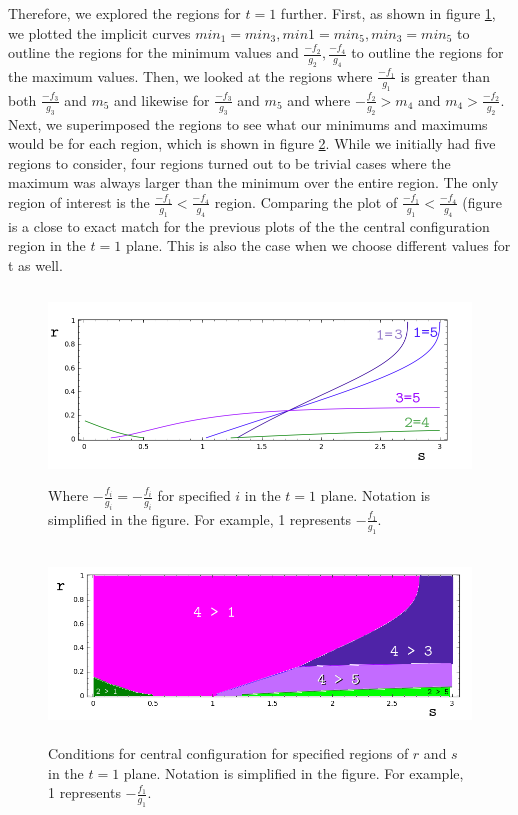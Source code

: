 \documentclass[11pt,leqno]{article}
\theoremstyle{definition}
\theoremstyle{remark}
\numberwithin{equation}{section}
\begin{document}
Therefore, we explored the regions for $t = 1$ further. First, as shown in figure \ref{rg0o}, we plotted the implicit curves $min_1=min_3, min1=min_5,min_3=min_5$ to outline the regions for the minimum values and $\frac{-f_2}{g_2},\frac{-f_4}{g_4}$ to outline the regions for the maximum values. Then, we looked at the regions where $\frac{-f_1}{g_1}$ is greater than both $\frac{-f_3}{g_3}$ and $m_5$ and likewise for $\frac{-f_3}{g_3}$ and $m_5$ and where $-\frac{f_2}{g_2}>m_4$ and $m_4>\frac{-f_2}{g_2}$. Next, we superimposed the regions to see what our minimums and maximums would be for each region, which is shown in figure \ref{rg0r}. While we initially had five regions to consider, four regions turned out to be trivial cases where the maximum was always larger than the minimum over the entire region. The only region of interest is the $\frac{-f_1}{g_1} < \frac{-f_4}{g_4}$ region. Comparing the plot of $\frac{-f_1}{g_1} < \frac{-f_4}{g_4}$ (figure is a close to exact match for the previous plots of the the central configuration region in the $t=1$ plane. This is also the case when we choose different values for t as well.



\begin{center}

\begin{figure}
\label{rg0o}  
\includegraphics[width=6in, height=2in]{t1regionOutline.png}
 \caption{ Where $-\frac{f_i}{g_i}=-\frac{f_i}{g_i}$ for specified $i$ in the $t=1$ plane. Notation is simplified in the figure. For example, 1 represents $-\frac{f_1}{g_1}$.} 
\end{figure}

\begin{figure}
\label{rg0r} 
\includegraphics[width=6in, height=2in]{t1rG0region.png}
 \caption{  Conditions for central configuration for specified regions of $r$ and $s$ in the $t=1$ plane. Notation is simplified in the figure. For example, 1 represents $-\frac{f_1}{g_1}$.}
\end{figure}

\end{center}
\end{document}
